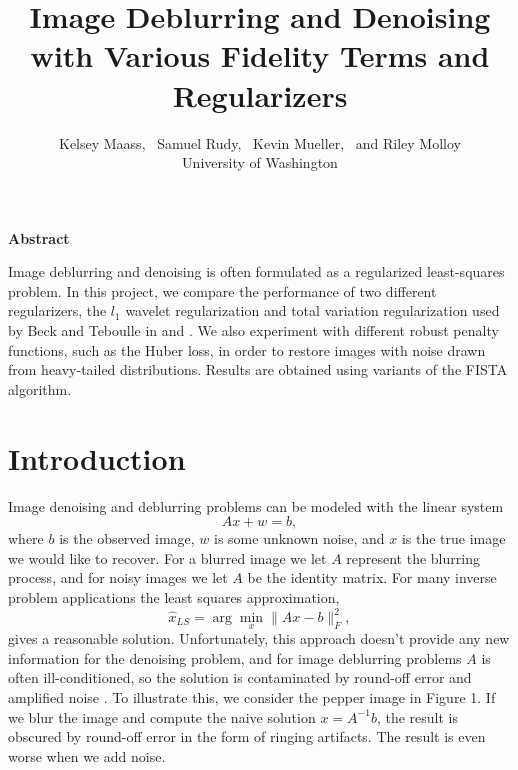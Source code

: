 \documentclass[10pt,a4paper]{article}
\begin{document}
	\title{Image Deblurring and Denoising \\with Various Fidelity Terms and Regularizers}
	\author{
		Kelsey Maass, ~Samuel Rudy, ~Kevin Mueller, ~and Riley Molloy\\
		University of Washington\\
	}
	
	\maketitle
	
	\begin{center}
		\begin{minipage}{0.8\textwidth}
			\begin{center}
				\textbf{Abstract}
			\end{center}
			Image deblurring and denoising is often formulated as a regularized least-squares problem. In this project, we compare the performance of two 
			different regularizers, the $l_1$ wavelet regularization and total variation regularization used by Beck and Teboulle in \cite{FISTA} and \cite{TV}. 
			We also experiment with different robust penalty functions, such as the Huber loss, in order to restore images with noise drawn from heavy-tailed 
			distributions. Results are obtained using variants of the FISTA algorithm. 
		\end{minipage}
	\end{center}
	
	\section{Introduction}
	Image denoising and deblurring problems can be modeled with the linear system
	\begin{equation}
	Ax + w = b,
	\end{equation}
	where $b$ is the observed image, $w$ is some unknown noise, and $x$ is the true image we would like to recover. For a blurred image we let $A$ represent the blurring process, and for noisy images we let $A$ be the identity matrix. For many inverse problem applications the least squares approximation, 
	\begin{equation}
	\hat{x}_{LS} = \arg\min_x \| Ax - b \|_F^2 ,
	\end{equation}
	gives a reasonable solution. Unfortunately, this approach doesn't provide any new information for the denoising problem, and for image deblurring problems $A$ is often ill-conditioned, so the solution is contaminated by round-off error and amplified noise \cite{DeblurBook}. To illustrate this, we consider the pepper image in Figure 1. If we blur the image and compute the naive solution $x = A^{-1}b$, the result is obscured by round-off error in the form of ringing artifacts. The result is even worse when we add noise.
	
\end{document}
